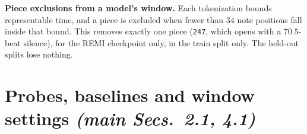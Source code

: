 \documentclass{article}
\begin{document}
\textbf{Piece exclusions from a model's window.} Each tokenization bounds
representable time, and a piece is excluded when fewer than $34$ note positions fall
inside that bound. This removes exactly one piece (\texttt{247}, which opens with a
$70.5$-beat silence), for the REMI checkpoint only, in the train split only. The
held-out splits lose nothing.

\section{Probes, baselines and window settings \normalfont\textit{(main Secs.~2.1, 4.1)}}
\label{sec:probes}
%
\end{document}
